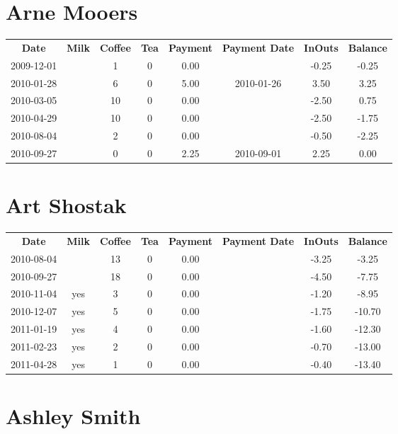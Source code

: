 \section{Arne Mooers}

\begin{center}
\begin{tabular}{cccccccc}
\textbf{Date} & \textbf{Milk} & \textbf{Coffee} & \textbf{Tea} & \textbf{Payment} & \textbf{Payment Date} & \textbf{InOuts} & \textbf{Balance} \\
2009-12-01 &  &  1 & 0 & 0.00 &  & -0.25 & -0.25\\ 
2010-01-28 &  &  6 & 0 & 5.00 & 2010-01-26 &  3.50 &  3.25\\ 
2010-03-05 &  & 10 & 0 & 0.00 &  & -2.50 &  0.75\\ 
2010-04-29 &  & 10 & 0 & 0.00 &  & -2.50 & -1.75\\ 
2010-08-04 &  &  2 & 0 & 0.00 &  & -0.50 & -2.25\\ 
2010-09-27 &  &  0 & 0 & 2.25 & 2010-09-01 &  2.25 &  0.00
\end{tabular}
\end{center}

\section{Art Shostak}

\begin{center}
\begin{tabular}{cccccccc}
\textbf{Date} & \textbf{Milk} & \textbf{Coffee} & \textbf{Tea} & \textbf{Payment} & \textbf{Payment Date} & \textbf{InOuts} & \textbf{Balance} \\
2010-08-04 &  & 13 & 0 & 0.00 &  & -3.25 &  -3.25\\ 
2010-09-27 &  & 18 & 0 & 0.00 &  & -4.50 &  -7.75\\ 
2010-11-04 & yes &  3 & 0 & 0.00 &  & -1.20 &  -8.95\\ 
2010-12-07 & yes &  5 & 0 & 0.00 &  & -1.75 & -10.70\\ 
2011-01-19 & yes &  4 & 0 & 0.00 &  & -1.60 & -12.30\\ 
2011-02-23 & yes &  2 & 0 & 0.00 &  & -0.70 & -13.00\\ 
2011-04-28 & yes &  1 & 0 & 0.00 &  & -0.40 & -13.40
\end{tabular}
\end{center}

\section{Ashley Smith}

